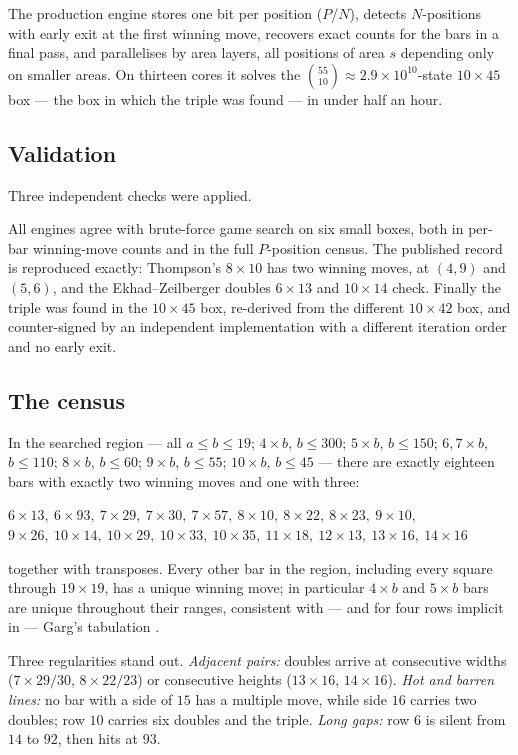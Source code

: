 \documentclass[11pt]{article}
\theoremstyle{definition}
\begin{document}
The production engine stores one bit per position ($P$/$N$), detects
$N$-positions with early exit at the first winning move, recovers exact counts
for the bars in a final pass, and parallelises by area layers, all positions of
area $s$ depending only on smaller areas. On thirteen cores it solves the
$\binom{55}{10}\approx2.9\times10^{10}$-state $10\times45$ box --- the box in
which the triple was found --- in under half an hour.

\subsection{Validation}

Three independent checks were applied.

All engines agree with brute-force game search on six small boxes, both in
per-bar winning-move counts and in the full $P$-position census. The published
record is reproduced exactly: Thompson's $8\times10$ has two winning moves, at
$(4,9)$ and $(5,6)$, and the Ekhad--Zeilberger doubles $6\times13$ and
$10\times14$ check. Finally the triple was found in the $10\times45$ box,
re-derived from the different $10\times42$ box, and counter-signed by an
independent implementation with a different iteration order and no early exit.

\subsection{The census}

In the searched region --- all $a\le b\le19$; $4\times b$, $b\le300$;
$5\times b$, $b\le150$; $6,7\times b$, $b\le110$; $8\times b$, $b\le60$;
$9\times b$, $b\le55$; $10\times b$, $b\le45$ --- there are exactly eighteen
bars with exactly two winning moves and one with three:
\begin{center}
$6\times13,\ 6\times93,\ 7\times29,\ 7\times30,\ 7\times57,\ 8\times10,\
8\times22,\ 8\times23,\ 9\times10,$\\
$9\times26,\ 10\times14,\ 10\times29,\ 10\times33,\ 10\times35,\ 11\times18,\
12\times13,\ 13\times16,\ 14\times16$
\end{center}
together with transposes. Every other bar in the region, including every square
through $19\times19$, has a unique winning move; in particular $4\times b$ and
$5\times b$ bars are unique throughout their ranges, consistent with --- and
for four rows implicit in --- Garg's tabulation \cite{Garg}.

Three regularities stand out. \emph{Adjacent pairs:} doubles arrive at
consecutive widths ($7\times29/30$, $8\times22/23$) or consecutive heights
($13\times16$, $14\times16$). \emph{Hot and barren lines:} no bar with a side
of $15$ has a multiple move, while side $16$ carries two doubles; row $10$
carries six doubles and the triple. \emph{Long gaps:} row $6$ is silent from
$14$ to $92$, then hits at $93$.
\end{document}
